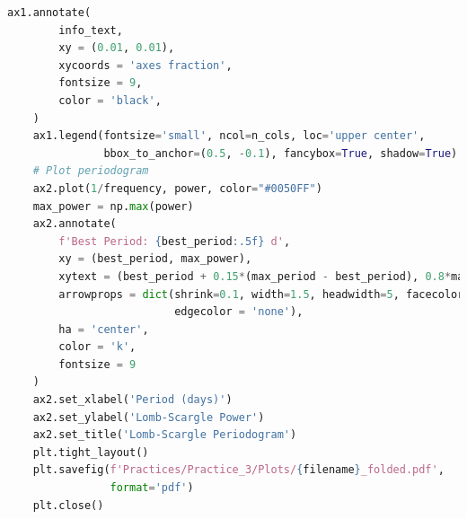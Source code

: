 \documentclass[a4paper,12pt]{article}
\newenvironment{solution}{}{}
\begin{document}
\begin{enumerate}
\begin{solution}
\begin{lstlisting}[language=python]
    ax1.annotate(
        info_text,
        xy = (0.01, 0.01),
        xycoords = 'axes fraction',
        fontsize = 9,
        color = 'black',
    )
    ax1.legend(fontsize='small', ncol=n_cols, loc='upper center',
               bbox_to_anchor=(0.5, -0.1), fancybox=True, shadow=True)
    # Plot periodogram
    ax2.plot(1/frequency, power, color="#0050FF")
    max_power = np.max(power)
    ax2.annotate(
        f'Best Period: {best_period:.5f} d',
        xy = (best_period, max_power),
        xytext = (best_period + 0.15*(max_period - best_period), 0.8*max_power),
        arrowprops = dict(shrink=0.1, width=1.5, headwidth=5, facecolor='orange',
                          edgecolor = 'none'),
        ha = 'center',
        color = 'k',
        fontsize = 9
    )
    ax2.set_xlabel('Period (days)')
    ax2.set_ylabel('Lomb-Scargle Power')
    ax2.set_title('Lomb-Scargle Periodogram')
    plt.tight_layout()
    plt.savefig(f'Practices/Practice_3/Plots/{filename}_folded.pdf',
                format='pdf')
    plt.close()


\end{lstlisting}
\end{solution}
\end{enumerate}
\end{document}
